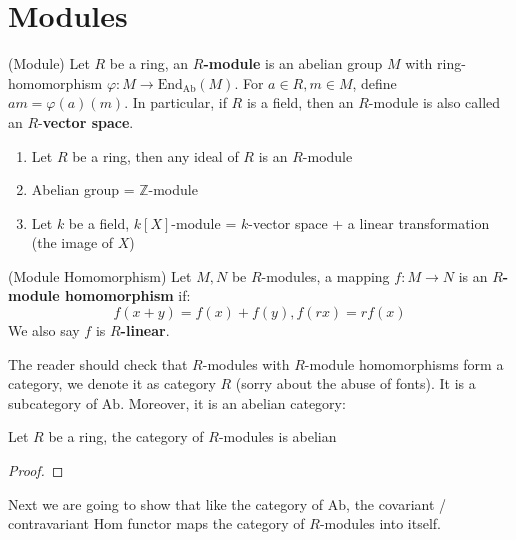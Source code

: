 \documentclass{note-eng}
\begin{document}
\section{Modules}

\begin{definition}
    (Module) Let $R$ be a ring, an \textbf{$R$-module} is an abelian group $M$ with ring-homomorphism $\varphi: M \rightarrow \mathrm{End}_{\mathrm{Ab}}(M)$. For $a \in R, m \in M$, define $am = \varphi(a)(m)$. In particular, if $R$ is a field, then an $R$-module is also called an $R$-\textbf{vector space}.
\end{definition}

\begin{example}
    \begin{enumerate}
        \item Let $R$ be a ring, then any ideal of $R$ is an $R$-module
        \item Abelian group = $\mathbb{Z}$-module
        \item Let $k$ be a field, $k[X]$-module = $k$-vector space + a linear transformation (the image of $X$)
    \end{enumerate}
\end{example}

\begin{definition}
    (Module Homomorphism) Let $M, N$ be $R$-modules, a mapping $f: M \rightarrow N$ is an \textbf{$R$-module homomorphism} if:
    $$f(x + y) = f(x) + f(y), f(rx) = rf(x)$$
    We also say $f$ is \textbf{$R$-linear}.
\end{definition}

The reader should check that $R$-modules with $R$-module homomorphisms form a category, we denote it as category $R$ (sorry about the abuse of fonts). It is a subcategory of $\mathrm{Ab}$. Moreover, it is an abelian category:

\begin{proposition}
    Let $R$ be a ring, the category of $R$-modules is abelian
\end{proposition}

\begin{proof}
    \TODO
\end{proof}


Next we are going to show that like the category of $\mathrm{Ab}$, the covariant / contravariant Hom functor maps the category of $R$-modules into itself.
\end{document}
